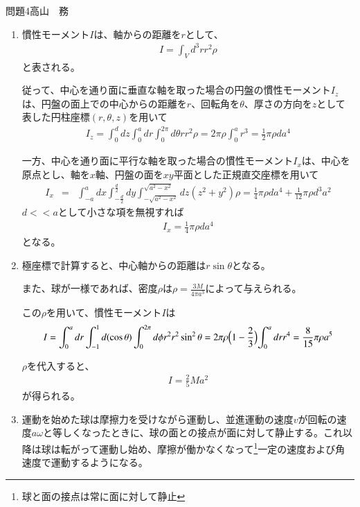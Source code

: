 \documentclass[fleqn]{jbook}
\begin{document}
\begin{answer}{問題4}{高山　務}
\setcounter{equation}{0}
\begin{enumerate}
\item
慣性モーメント$I$は、軸からの距離を$r$として、
\begin{eqnarray}
I=\int_V d^3 r r^2 \rho
\end{eqnarray}
と表される。

従って、中心を通り面に垂直な軸を取った場合の円盤の慣性モーメント$I_z$は、円盤の面上での中心からの距離を$r$、回転角を$\theta$、厚さの方向を$z$として表した円柱座標$(r,\theta,z)$を用いて
\begin{eqnarray}
I_z = \int_0^d dz \int_0^a dr \int_0^{2\pi} d\theta r r^2 \rho = 2 \pi \rho \int_0^a r^3 = \frac{1}{2}\pi \rho d a^4
\end{eqnarray}

一方、中心を通り面に平行な軸を取った場合の慣性モーメント$I_x$は、中心を原点とし、軸を$x$軸、円盤の面を$xy$平面とした正規直交座標を用いて
\begin{eqnarray}
I_x &=& \int_{-a}^a dx \int_{-\frac{d}{2}}^{\frac{d}{2}} dy \int_{-\sqrt{a^2-x^2}}^{\sqrt{a^2-x^2}} dz (z^2 + y^2)\rho = \frac{1}{4}\pi\rho da^4+\frac{1}{12}\pi\rho d^3a^2
\end{eqnarray}
$d<<a$として小さな項を無視すれば
\begin{eqnarray}
I_x = \frac{1}{4}\pi\rho da^4
\end{eqnarray}
となる。
\item
極座標で計算すると、中心軸からの距離は$r\sin\theta$となる。

また、球が一様であれば、密度$\rho$は$\displaystyle \rho=\frac{3M}{4\pi a^3}$によって与えられる。

この$\rho$を用いて、慣性モーメント$I$は
\begin{eqnarray}
I=\int_0^a dr \int_{-1}^1 d(\cos\theta) \int_0^{2\pi} d\phi r^2 r^2 \sin^2\theta = 2\pi \rho \Bigl(1-\frac{2}{3} \Bigl) \int_0^a dr r^4 = \frac{8}{15}\pi \rho a^5
\end{eqnarray}

$\rho$を代入すると、
\begin{eqnarray}
I=\frac{2}{5}Ma^2
\end{eqnarray}
が得られる。
\item
運動を始めた球は摩擦力を受けながら運動し、並進運動の速度$v$が回転の速度$a\omega$と等しくなったときに、球の面との接点が面に対して静止する。これ以降は球は転がって運動し始め、摩擦が働かなくなって\footnote{球と面の接点は常に面に対して静止}一定の速度および角速度で運動するようになる。


\end{enumerate}
\end{answer}
\end{document}
